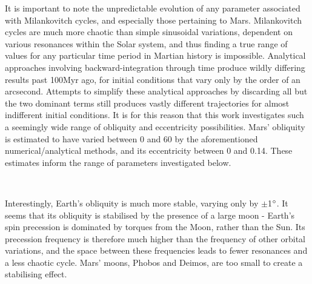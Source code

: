 \documentclass[12pt,onecolumn]{revtex4-2}    %
\begin{document}
It is important to note the unpredictable evolution of any parameter associated with Milankovitch cycles, and especially those pertaining to Mars. Milankovitch cycles are much more chaotic than simple sinusoidal variations, dependent on various resonances within the Solar system, and thus finding a true range of values for any particular time period in Martian history is impossible. Analytical approaches involving backward-integration through time produce wildly differing results past 100Myr ago, for initial conditions that vary only by the order of an arcsecond. Attempts to simplify these analytical approaches by discarding all but the two dominant terms still produces vastly different trajectories for almost indifferent initial conditions. It is for this reason that this work investigates such a seemingly wide range of obliquity and eccentricity possibilities. Mars' obliquity is estimated to have varied between 0 and 60 \degree by the aforementioned numerical/analytical methods, and its eccentricity between 0 and 0.14. These estimates inform the range of parameters investigated below.

\

Interestingly, Earth's obliquity is much more stable, varying only by $\pm$1$\degree$. It seems that its obliquity is stabilised by the presence of a large moon - Earth's spin precession is dominated by torques from the Moon, rather than the Sun. Its precession frequency is therefore much higher than the frequency of other orbital variations, and the space between these frequencies leads to fewer resonances and a less chaotic cycle. Mars' moons, Phobos and Deimos, are too small to create a stabilising effect.

\
\end{document}

